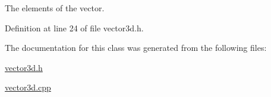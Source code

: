 \-The elements of the vector. 



\-Definition at line 24 of file vector3d.\-h.



\-The documentation for this class was generated from the following files\-:\begin{DoxyCompactItemize}
\item 
\hyperlink{vector3d_8h}{vector3d.\-h}\item 
\hyperlink{vector3d_8cpp}{vector3d.\-cpp}\end{DoxyCompactItemize}
